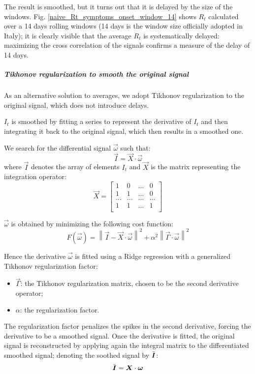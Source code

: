 \documentclass[graybox]{svmult}
\begin{document}
The result is smoothed, but it turns out that it is delayed by the size of the windows. Fig. \ref{naive_Rt_symptoms_onset_window_14} shows $R_t$ calculated over a 14 days rolling windows (14 days is the window size officially adopted in Italy); it is clearly visible that the average $R_t$ is systematically delayed: maximizing the cross correlation of the signals confirms a measure of the delay of 14 days.

\subparagraph{Tikhonov regularization to smooth the original signal}

As an alternative solution to averages, we adopt Tikhonov regularization to the original signal, which does not introduce delays.

$I_t$ is smoothed by fitting a series to represent the derivative of $I_t$ and then integrating it back to the original signal, which then results in a smoothed one.

We search for the differential signal $\vec{\omega}$ such that:
$$\vec{I} = \vec{X}\cdot \vec{\omega}$$
where $\vec{I}$ denotes the array of elements $I_t$ and $\vec{X}$ is the matrix representing the integration operator:
$$\vec{X} = \begin{bmatrix} 
1 & 0 & ... & 0 \\
1 & 1 & ... & 0 \\
... & ... & ...  & ... \\
1 & 1 & ... & 1 \\
\end{bmatrix}
$$

$\vec{\omega}$ is obtained by minimizing the following cost function:
\begin{equation}
F(\vec{\omega}) = \left\|\vec{I} - \vec{X}\cdot\vec{\omega}\right\|^2 +\alpha^2 \left\|\vec{\Gamma}\cdot\vec{\omega}\right\|^2
\label{TickCostFunction}
\end{equation}

Hence the derivative $\vec{\omega}$ is fitted using a Ridge regression with a generalized Tikhonov regularization factor:
\begin{itemize}
    \item 
    $\vec{\Gamma}$: the Tikhonov regularization matrix, chosen to be the second derivative operator;
    \item
    $\alpha$: the regularization factor.
\end{itemize}

The regularization factor penalizes the spikes in the second derivative, forcing the derivative to be a smoothed signal. Once the derivative is fitted, the original signal is reconstructed by applying again the integral matrix to the differentiated smoothed signal; denoting the soothed signal by $\Bar{\vec{I}}$:
$$\Bar{\vec{I}} = \vec{X}\cdot\vec{\omega}$$
\end{document}
